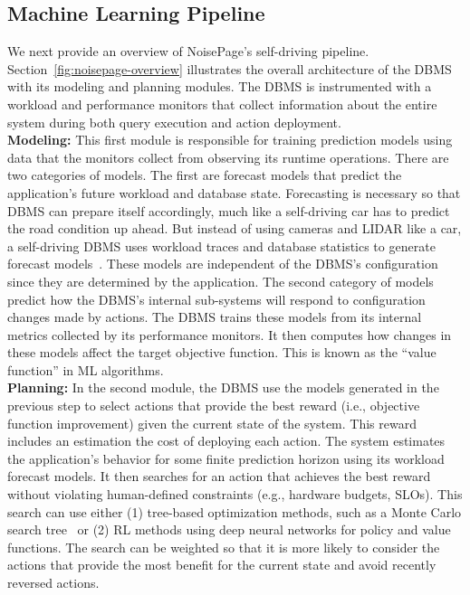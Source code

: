 \documentclass[11pt,times]{article}
\newcommand{\noisepage}{NoisePage\xspace}
\begin{document}
\subsection{Machine Learning Pipeline}
\label{sec:selfdriving-pipeline}
We next provide an overview of \noisepage's self-driving pipeline. 
Section~\ref{fig:noisepage-overview} illustrates the overall architecture of the DBMS with its modeling 
and planning modules. The DBMS is instrumented with a workload and performance monitors that collect 
information about the entire system during both query execution and action deployment.
\vspace*{-0.1in} \\

\textbf{Modeling:}
This first module is responsible for training prediction models using data that the monitors 
collect from observing its runtime operations. 
There are two categories of models. The first are forecast models that predict the 
application's future workload and database state. 
Forecasting is necessary so that DBMS can prepare itself accordingly, much like a self-driving car 
has to predict the road condition up ahead.
But instead of using cameras and LIDAR like a car, a self-driving DBMS uses workload traces and 
database statistics to generate forecast models~\cite{ma18}. These models are independent of the 
DBMS's configuration since they are determined by the application.
The second category of models predict how the DBMS's internal sub-systems will respond to 
configuration changes made by actions. The DBMS trains these models from its internal metrics 
collected by its performance monitors. It then computes how changes in these models affect the 
target objective function. This is known as the ``value function'' in ML algorithms.
\vspace*{-0.1in} \\

\textbf{Planning:}
In the second module, the DBMS use the models generated in the previous step to select actions 
that provide the best reward (i.e., objective function improvement) given the current state of the 
system. This reward includes an estimation the cost of deploying each action.
The system estimates the application's behavior for some finite prediction horizon using its 
workload forecast models. It then searches for an action that achieves the best reward without 
violating human-defined constraints (e.g., hardware budgets, SLOs).
This search can use either (1) tree-based optimization methods, such as a Monte Carlo search 
tree~\cite{silver16} or (2) RL methods using deep neural networks for policy and value functions. 
The search can be weighted so that it is more likely to consider the actions that provide the most 
benefit for the current state and avoid recently reversed actions.
\end{document}
